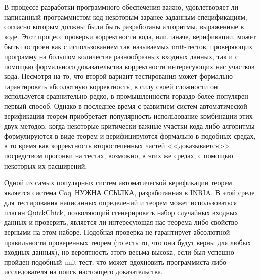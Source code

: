



\usepackage{fancyvrb}
\usepackage{tikz}
\usepackage{float}
\usepackage{stmaryrd}
\usepackage{mathrsfs}
\usetikzlibrary{arrows}


\DeclareMathOperator{\bttr}{T\_tr}
\DeclareMathOperator{\btnil}{T\_nil}

\newcommand{\tbttr}{T\_tr}
\newcommand{\tcoq}{Coq}
\newcommand{\tqc}{QuickChick}

\newcommand{\brc}[1]{{\color{red}#1}}



\Intro

В процессе разработки программного обеспечения важно, удовлетворяет ли написанный программистом код некоторым заранее заданным спецификациям, согласно которым должны были быть разработаны алгоритмы, выраженные в коде. Этот процесс проверки корректности кода, или, иначе, верификации, может быть построен как с использованием так называемых unit-тестов, проверяющих программу на большом количестве разнообразных входных данных, так и с помощью формального доказательства корректности интересующих нас участков кода. Несмотря на то, что второй вариант тестирования может формально гарантировать абсолютную корректность, в силу своей сложности он используется сравнительно редко, в промышленности гораздо более популярен первый способ. Однако в последнее время с развитием систем автоматической верификации теорем приобретает популярность использование комбинации этих двух методов, когда некоторые критически важные участки кода либо алгоритмы формулируются в виде теорем и верифицируются формально в подобных средах, в то время как корректность второстепенных частей <<доказывается>> посредством прогонки на тестах, возможно, в этих же средах, с помощью некоторых их расширений.

Одной из самых популярных систем автоматической верификации теорем является система \tcoq~\brc{НУЖНА ССЫЛКА}, разработанная в INRIA. В этой среде для тестирования написанных определений и теорем может использоваться плагин \tqc, позволяющий сгенерировать набор случайных входных данных и проверить, является ли интересующая нас теорема либо свойство верными на этом наборе. Подобная проверка не гарантирует абсолютной правильности проверенных теорем (то есть то, что они будут верны для любых входных данных), но вероятность этого весьма высока, если был успешно пройден подобный unit-тест, что может вдохновить программиста либо исследователя на поиск настоящего доказательства.


